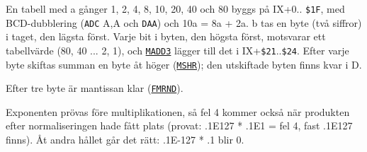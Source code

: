 \begin{Listing}
\begin{Cmt}
\par\noindent En tabell med a gånger 1, 2, 4, 8, 10, 20, 40 och 80 byggs på IX+0.. \texttt{\$1F}, med BCD-dubblering (\texttt{ADC} A,A och \texttt{DAA}) och 10a = 8a + 2a. b tas en byte (två siffror) i taget, den lägsta först. Varje bit i byten, den högsta först, motsvarar ett tabellvärde (80, 40 ... 2, 1), och \hyperlink{l:MADD3}{\texttt{MADD3}} lägger till det i IX+\texttt{\$21}..\texttt{\$24}. Efter varje byte skiftas summan en byte åt höger (\hyperlink{l:MSHR}{\texttt{MSHR}}); den utskiftade byten finns kvar i D.\par
\par\noindent Efter tre byte är mantissan klar (\hyperlink{l:FMRND}{\texttt{FMRND}}).\par
\par\noindent Exponenten prövas före multiplikationen, så fel 4 kommer också när produkten efter normaliseringen hade fått plats (provat: .1E127 * .1E1 = fel 4, fast .1E127 finns). Åt andra hållet går det rätt: .1E\mbox{-}127 * .1 blir 0.\par\end{Cmt}
\Gap
{}

\end{Listing}

